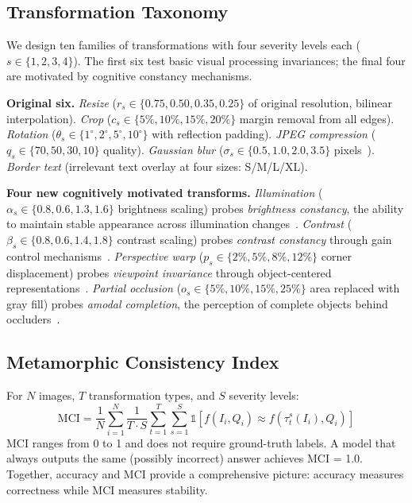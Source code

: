 \documentclass{cvpr}
\begin{document}
\subsection{Transformation Taxonomy}
\label{sec:transformations}

We design ten families of transformations with four severity levels each ($s \in \{1,2,3,4\}$). The first six test basic visual processing invariances; the final four are motivated by cognitive constancy mechanisms.

\textbf{Original six.} \textit{Resize} ($r_s \in \{0.75, 0.50, 0.35, 0.25\}$ of original resolution, bilinear interpolation). \textit{Crop} ($c_s \in \{5\%, 10\%, 15\%, 20\%\}$ margin removal from all edges). \textit{Rotation} ($\theta_s \in \{1^\circ, 2^\circ, 5^\circ, 10^\circ\}$ with reflection padding). \textit{JPEG compression} ($q_s \in \{70, 50, 30, 10\}$ quality). \textit{Gaussian blur} ($\sigma_s \in \{0.5, 1.0, 2.0, 3.5\}$ pixels~\cite{jang2024improved}). \textit{Border text} (irrelevant text overlay at four sizes: S/M/L/XL).

\textbf{Four new cognitively motivated transforms.} \textit{Illumination} ($\alpha_s \in \{0.8, 0.6, 1.3, 1.6\}$ brightness scaling) probes \textit{brightness constancy}, the ability to maintain stable appearance across illumination changes~\cite{walsh2014perceptual}. \textit{Contrast} ($\beta_s \in \{0.8, 0.6, 1.4, 1.8\}$ contrast scaling) probes \textit{contrast constancy} through gain control mechanisms~\cite{palmer1999vision}. \textit{Perspective warp} ($p_s \in \{2\%, 5\%, 8\%, 12\%\}$ corner displacement) probes \textit{viewpoint invariance} through object-centered representations~\cite{marr1982vision}. \textit{Partial occlusion} ($o_s \in \{5\%, 10\%, 15\%, 25\%\}$ area replaced with gray fill) probes \textit{amodal completion}, the perception of complete objects behind occluders~\cite{kanizsa1979organization}.

\subsection{Metamorphic Consistency Index}
\label{sec:mci}

For $N$ images, $T$ transformation types, and $S$ severity levels:
\begin{equation}
    \text{MCI} = \frac{1}{N} \sum_{i=1}^{N} \frac{1}{T \cdot S} \sum_{t=1}^{T} \sum_{s=1}^{S} \mathbb{1}\left[f(I_i, Q_i) \approx f(\tau_t^s(I_i), Q_i)\right]
    \label{eq:mci}
\end{equation}
MCI ranges from 0 to 1 and does not require ground-truth labels. A model that always outputs the same (possibly incorrect) answer achieves MCI = 1.0. Together, accuracy and MCI provide a comprehensive picture: accuracy measures correctness while MCI measures stability.
\end{document}
